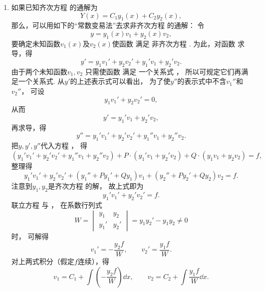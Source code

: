 \begin{enumerate}
\item%
如果已知齐次方程  的通解为\[
Y(x) = C_1 y_1(x) + C_2 y_2(x),
\]那么，可以用如下的“常数变易法”去求非齐次方程  的通解：
令\begin{equation}\label{equation:微分方程.二阶非齐次线性微分方程的通解设想}
y = y_1(x) v_1 + y_2(x) v_2,
\end{equation}
要确定未知函数\(v_1(x)\)及\(v_2(x)\)使函数  满足%
非齐次方程 .
为此，对函数  求导，得\[
	y' = y_1 v_1' + y_2 v_2' + y_1' v_1 + y_2' v_2.
\]
由于两个未知函数\(v_1,v_2\)
只需使函数  满足%
一个关系式 ，
所以可规定它们再满足一个关系式.
从\(y'\)的上述表示式可以看出，
为了使\(y''\)的表示式中不含\(v_1''\)和\(v_2''\)，
可设\begin{equation}\label{equation:微分方程.二阶非齐次线性微分方程的额外条件1}
	y_1 v_1' + y_2 v_2' = 0,
\end{equation}
从而\[
	y' = y_1' v_1 + y_2' v_2,
\]
再求导，得\[
	y'' = y_1' v_1' + y_2' v_2' + y_1'' v_1 + y_2'' v_2.
\]
把\(y,y',y''\)代入方程 ，
得\[
	(y_1' v_1' + y_2' v_2' + y_1'' v_1 + y_2'' v_2)
	+P\cdot(y_1' v_1 + y_2' v_2) + Q\cdot(y_1 v_1 + y_2 v_2) = f,
\]
整理得\[
	y_1' v_1' + y_2' v_2'
	+ (y_1'' + P y_1' + Q y_1) v_1
	+ (y_2'' + P y_2' + Q y_2) v_2
	= f.
\]
注意到\(y_1,y_2\)是齐次方程  的解，
故上式即为
\begin{equation}\label{equation:微分方程.二阶非齐次线性微分方程的额外条件2}
	y_1' v_1' + y_2' v_2' = f.
\end{equation}
联立方程 
与 ，
在系数行列式\[
	W = \begin{vmatrix} y_1 & y_2 \\ y_1' & y_2' \end{vmatrix}
	= y_1 y_2' - y_1 y_2 \neq0
\]时，
可解得\[
	v_1' = -\frac{y_2 f}{W},
	\qquad
	v_2' = \frac{y_1 f}{W}.
\]
对上两式积分（假定\(f\)连续），得\[
	v_1 = C_1 + \int \left(-\frac{y_2 f}{W}\right) \dd{x},
	\qquad
	v_2 = C_2 + \int \frac{y_1 f}{W} \dd{x}.
\]


\end{enumerate}
